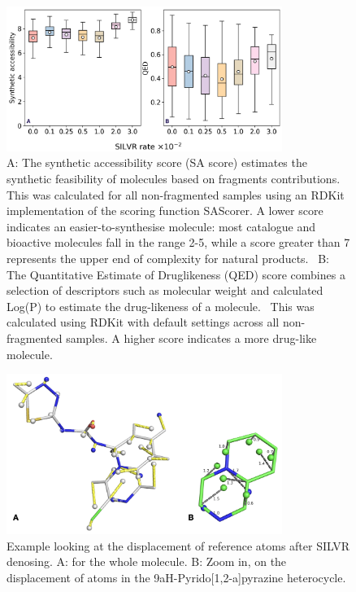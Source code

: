 \documentclass[journal=jacsat,manuscript=article]{achemso}
\begin{document}
\begin{suppinfo}
\begin{figure}
    \centering
    \includegraphics[width=0.8\textwidth]{paper/Figures/FigS4/si_fig_2d_measures.png}
    \caption{A: The synthetic accessibility score (SA score) estimates the synthetic feasibility of molecules based on fragments contributions.~\cite{ertl2009estimation} This was calculated for all non-fragmented samples using an RDKit implementation of the scoring function SAScorer. A lower score indicates an easier-to-synthesise molecule: most catalogue and bioactive molecules fall in the range 2-5, while a score greater than 7 represents the upper end of complexity for natural products.~\cite{ertl2009estimation} B: The Quantitative Estimate of Druglikeness (QED) score combines a selection of descriptors such as molecular weight and calculated Log(P) to estimate the drug-likeness of a molecule.~\cite{bickerton2012quantifying, wildman1999prediction} This was calculated using RDKit with default settings across all non-fragmented samples. A higher score indicates a more drug-like molecule.}
    \label{fig:SA_QED}
\end{figure}

\begin{figure}
    \centering
    \includegraphics[width=0.8\textwidth]{paper/Figures/FigS5/FigS3.png}
    \caption{Example looking at the displacement of reference atoms after SILVR denosing. A: for the whole molecule. B: Zoom in, on the displacement of atoms in the 9aH-Pyrido[1,2-a]pyrazine heterocycle. }
    \label{fig:atom_displacement}
\end{figure}


\end{suppinfo}
\end{document}
